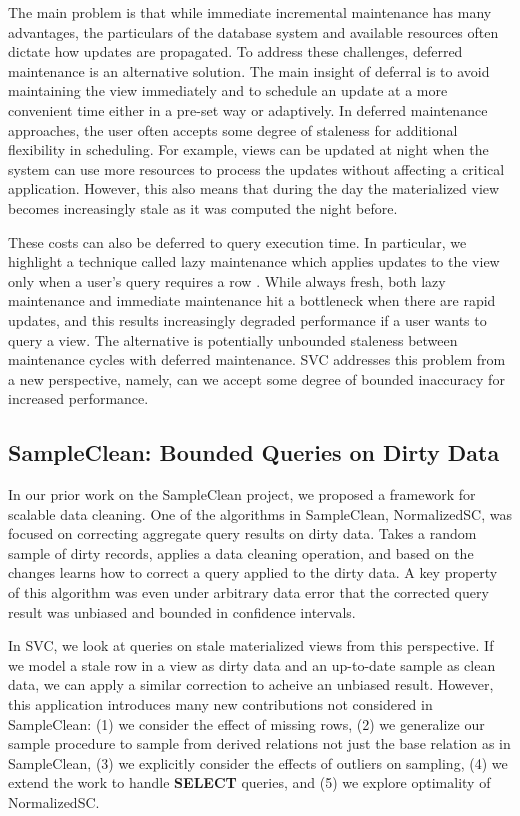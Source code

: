 The main problem is that while immediate incremental maintenance has many advantages, the particulars of the database system and available resources often dictate how updates are propagated.
To address these challenges, deferred maintenance is an alternative solution.
The main insight of deferral is to avoid maintaining the view immediately and to schedule an update at a more convenient time either in a pre-set way or adaptively.
In deferred maintenance approaches, the user often accepts some degree of staleness for additional flexibility in scheduling.
For example, views can be updated at night when the system can use more resources to process the updates without affecting a critical application.
However, this also means that during the day the materialized view becomes increasingly stale as it was computed the night before.

These costs can also be deferred to query execution time.
In particular, we highlight a technique called lazy maintenance which applies updates to the view only when a user's query requires a row \cite{zhou2007lazy}.
While always fresh, both lazy maintenance and immediate maintenance hit a bottleneck when there are rapid updates, and this results increasingly degraded performance if a user wants to query a view.
The alternative is potentially unbounded staleness between maintenance cycles with deferred maintenance.
SVC addresses this problem from a new perspective, namely, can we accept some degree of bounded inaccuracy for increased performance.

\subsection{SampleClean: Bounded Queries on Dirty Data}
In our prior work on the SampleClean project, we proposed a framework for scalable data cleaning.
One of the algorithms in SampleClean, NormalizedSC, was focused on correcting aggregate query results on dirty data.
Takes a random sample of dirty records, applies a data cleaning operation, and based on the changes learns how to correct a query applied to the dirty data.
A key property of this algorithm was even under arbitrary data error that the corrected query result was unbiased and bounded in confidence intervals.

In SVC, we look at queries on stale materialized views from this perspective.
If we model a stale row in a view as dirty data and an up-to-date sample as clean data, we can apply a similar correction to acheive an unbiased result.
However, this application introduces many new contributions not considered in SampleClean: (1) we consider the effect of missing rows, (2) we generalize our sample procedure to sample from derived relations not just the base relation as in SampleClean, (3) we explicitly consider the effects of outliers on sampling, (4) we extend the work to handle \textbf{SELECT} queries, and (5) we explore optimality of NormalizedSC.

